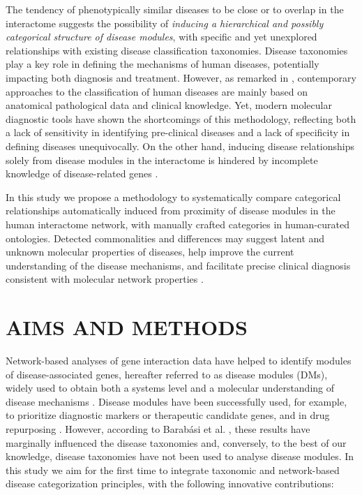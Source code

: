 \documentclass[journal,twoside,web]{ieeecolor}
\begin{document}
The tendency of phenotypically similar diseases to be close  or to overlap in the interactome
suggests the possibility of \textit{inducing a hierarchical and possibly categorical structure of  disease modules}, with specific and yet unexplored
relationships with existing disease classification taxonomies. 
Disease taxonomies play a key role in defining the mechanisms of human diseases, potentially impacting both diagnosis and treatment. However, as remarked in \cite{networkmedicine, loscalzo2007human,zhou2018systems}, contemporary approaches to the classification of human diseases are mainly based on 
anatomical pathological data and clinical knowledge.
Yet, modern molecular diagnostic tools have shown the shortcomings of this methodology, reflecting both a lack of sensitivity in identifying pre-clinical diseases and a lack of specificity in defining diseases unequivocally. On the other hand,  inducing disease relationships solely from disease modules in the interactome is hindered by incomplete knowledge of disease-related genes \cite{networkmedicine, omim}. 

In this study we propose a methodology  to systematically compare  categorical relationships automatically induced from proximity of disease modules in the human interactome  network, with manually crafted categories in human-curated  ontologies.   Detected commonalities and differences may suggest latent and unknown molecular properties of diseases,  help  improve the current understanding of the disease mechanisms,  and
facilitate precise clinical diagnosis consistent with molecular network properties \cite{Ghiassian2015, madeddu2020feature, cheng2019network, van2018gene}. 


\vspace{-5pt}
\section{AIMS AND METHODS}
Network-based analyses of gene interaction data have helped to identify modules of disease-associated genes, hereafter referred to as disease modules (DMs), widely used to obtain both a systems level and a molecular understanding of disease mechanisms \cite{gustafsson2014modules}. Disease modules have been successfully used, for example,  to prioritize diagnostic markers or therapeutic candidate genes, and in drug repurposing \cite{cheng2019network, networkmedicine, ay2007drug}. 
However, according to Barabási et al.  \cite{networkmedicine}, these results have marginally influenced the disease taxonomies and, conversely, to the best of our knowledge, disease taxonomies have not been used to analyse disease modules. In this study we aim for the first time to integrate taxonomic and network-based disease categorization principles, with the following innovative contributions: 
\end{document}
